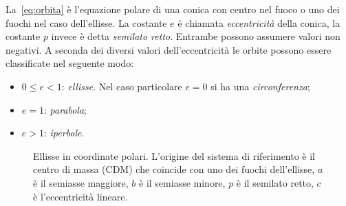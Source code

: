 La~\eqref{eq:orbita} è l'equazione polare di una conica con centro nel fuoco o
uno dei fuochi nel caso dell'ellisse. La costante $e$ è chiamata
\emph{eccentricità} della conica, la costante $p$ invece è detta \emph{semilato
  retto}. Entrambe possono assumere valori non negativi. A seconda dei diversi
valori dell'eccentricità le orbite possono essere classificate nel seguente
modo:
\begin{itemize}
\item $0\leq e<1$: \emph{ellisse}. Nel caso particolare $e=0$ si ha una
  \emph{circonferenza};
\item $e=1$: \emph{parabola};
\item $e>1$: \emph{iperbole}.
\end{itemize}
\begin{figure}
  \centering
  
  \caption{Ellisse in coordinate polari. L'origine del sistema di riferimento è
    il centro di massa (CDM) che coincide con uno dei fuochi dell'ellisse, $a$ è
    il semiasse maggiore, $b$ è il semiasse minore, $p$ è il semilato retto, $c$
    è l'eccentricità lineare.}
  \label{fig:ellisse}
\end{figure}

